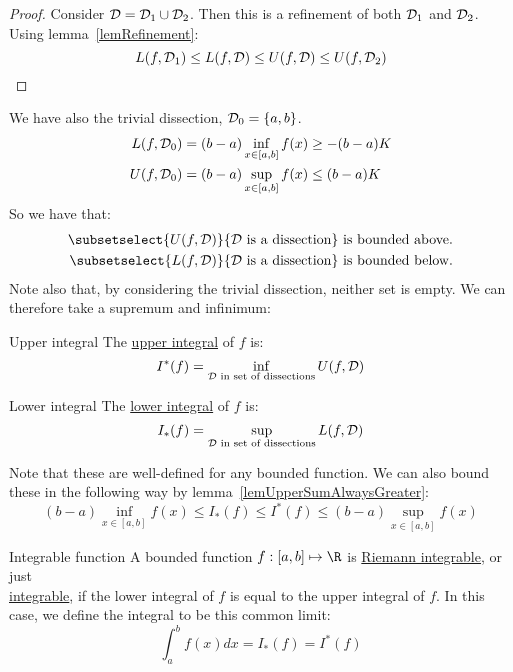 \documentclass[../Main.tex]{subfiles}
\begin{document}
\begin{proof}
    Consider $\mathcal{D} = \mathcal{D}_1 \cup \mathcal{D}_2$. Then this is a refinement of both $\mathcal{D}_1$ and $\mathcal{D}_2$. Using lemma~\ref{lemRefinement}:
    \begin{equation*}
        L(f, \mathcal{D}_1) \leq L(f, \mathcal{D}) \leq U(f, \mathcal{D}) \leq U(f, \mathcal{D}_2)
    \end{equation*}
\end{proof}
We have also the trivial dissection, $\mathcal{D}_0 = \{a, b\}$.
\begin{align*}
    L(f, \mathcal{D}_0) &= (b - a) \inf_{x \in [a, b]} f(x) \geq -(b - a)K \\
    U(f, \mathcal{D}_0) &= (b - a) \sup_{x \in [a, b]} f(x) \leq (b - a)K
\end{align*}
So we have that:
\begin{align*}
    \subsetselect{U(f, \dissec)}{\dissec \text{ is a dissection}} \text{ is bounded above.}\\
    \subsetselect{L(f, \dissec)}{\dissec \text{ is a dissection}} \text{ is bounded below.}
\end{align*}
Note also that, by considering the trivial dissection, neither set is empty. We can therefore take a supremum and infinimum:
\begin{definition}{Upper integral}
    The \underline{upper integral} of $f$ is:
    \begin{equation*}
        I^*(f) = \inf_{\mathcal{D}\text{ in set of dissections}} U(f, \mathcal{D})
    \end{equation*}
\end{definition}
\begin{definition}{Lower integral}
    The \underline{lower integral} of $f$ is:
    \begin{equation*}
        I_*(f) = \sup_{\mathcal{D}\text{ in set of dissections}} L(f, \mathcal{D})
    \end{equation*}
\end{definition}
Note that these are well-defined for any bounded function. We can also bound these in the following way by lemma~\ref{lemUpperSumAlwaysGreater}:
\begin{equation*}
    (b - a)\inf_{x \in [a, b]}f(x) \leq I_*(f) \leq I^*(f) \leq (b - a) \sup_{x \in [a, b]}f(x)
\end{equation*}
\begin{definition}{Integrable function}
    A bounded function $f : [a, b] \mapsto \R$ is \underline{Riemann integrable}, or just\\\underline{integrable}, if the lower integral of $f$ is equal to the upper integral of $f$. In this case, we define the integral to be this common limit:
    \begin{equation*}
        \int_a^b f(x) dx = I_*(f) = I^*(f)
    \end{equation*}
\end{definition}
\end{document}
